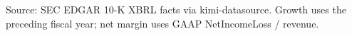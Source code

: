 \label{tab:annual}
{\footnotesize Source: SEC EDGAR 10-K XBRL facts via kimi-datasource. Growth uses the preceding fiscal year; net margin uses GAAP NetIncomeLoss / revenue.\par}
{\footnotesize\setlength{\tabcolsep}{5pt}\par}
